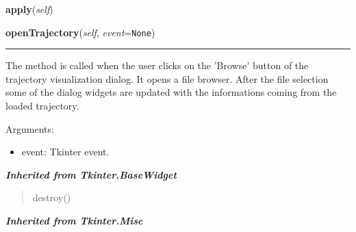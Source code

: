 \hspace{.8\funcindent}\begin{boxedminipage}{\funcwidth}

    \raggedright \textbf{apply}(\textit{self})

\setlength{\parskip}{2ex}
\setlength{\parskip}{1ex}
    \end{boxedminipage}

    \label{nMOLDYN:GUI:AnimationDialog:AnimationDialog:openTrajectory}

    \vspace{0.5ex}

\hspace{.8\funcindent}\begin{boxedminipage}{\funcwidth}

    \raggedright \textbf{openTrajectory}(\textit{self}, \textit{event}={\tt None})

    \vspace{-1.5ex}

    \rule{\textwidth}{0.5\fboxrule}
\setlength{\parskip}{2ex}
    The method is called when the user clicks on the 'Browse' button of the
    trajectory visualization dialog. It opens a file browser. After the 
    file selection some of the dialog widgets are updated with the 
    informations coming from the loaded trajectory.

    Arguments:

    \begin{itemize}
    \setlength{\parskip}{0.6ex}
      \item event: Tkinter event.

    \end{itemize}

\setlength{\parskip}{1ex}
    \end{boxedminipage}


\large{\textbf{\textit{Inherited from Tkinter.BaseWidget}}}

\begin{quote}
destroy()
\end{quote}

\large{\textbf{\textit{Inherited from Tkinter.Misc}}}

